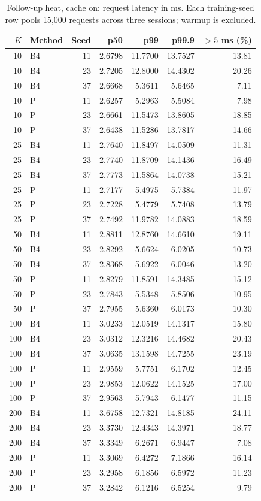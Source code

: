 \begin{table}[ht]
\centering\small
\caption{Follow-up heat, cache on: request latency in ms. Each training-seed row pools 15,000 requests across three sessions; warmup is excluded.}\label{tab:e2_seed_heat_on}
\begin{tabular}{@{}rlrrrrr@{}}\toprule
$K$ & Method & Seed & p50 & p99 & p99.9 & $>5$ ms (\%)\\\midrule
10 & B4 & 11 & 2.6798 & 11.7700 & 13.7527 & 13.81\\
10 & B4 & 23 & 2.7205 & 12.8000 & 14.4302 & 20.26\\
10 & B4 & 37 & 2.6668 & 5.3611 & 5.6465 & 7.11\\
10 & P & 11 & 2.6257 & 5.2963 & 5.5084 & 7.98\\
10 & P & 23 & 2.6661 & 11.5473 & 13.8605 & 18.85\\
10 & P & 37 & 2.6438 & 11.5286 & 13.7817 & 14.66\\
25 & B4 & 11 & 2.7640 & 11.8497 & 14.0509 & 11.31\\
25 & B4 & 23 & 2.7740 & 11.8709 & 14.1436 & 16.49\\
25 & B4 & 37 & 2.7773 & 11.5864 & 14.0738 & 15.21\\
25 & P & 11 & 2.7177 & 5.4975 & 5.7384 & 11.97\\
25 & P & 23 & 2.7228 & 5.4779 & 5.7408 & 13.79\\
25 & P & 37 & 2.7492 & 11.9782 & 14.0883 & 18.59\\
50 & B4 & 11 & 2.8811 & 12.8760 & 14.6610 & 19.11\\
50 & B4 & 23 & 2.8292 & 5.6624 & 6.0205 & 10.73\\
50 & B4 & 37 & 2.8368 & 5.6922 & 6.0046 & 13.20\\
50 & P & 11 & 2.8279 & 11.8591 & 14.3485 & 15.12\\
50 & P & 23 & 2.7843 & 5.5348 & 5.8506 & 10.95\\
50 & P & 37 & 2.7955 & 5.6360 & 6.0173 & 10.30\\
100 & B4 & 11 & 3.0233 & 12.0519 & 14.1317 & 15.80\\
100 & B4 & 23 & 3.0312 & 12.3216 & 14.4682 & 20.43\\
100 & B4 & 37 & 3.0635 & 13.1598 & 14.7255 & 23.19\\
100 & P & 11 & 2.9559 & 5.7751 & 6.1702 & 12.45\\
100 & P & 23 & 2.9853 & 12.0622 & 14.1525 & 17.00\\
100 & P & 37 & 2.9563 & 5.7943 & 6.1477 & 11.15\\
200 & B4 & 11 & 3.6758 & 12.7321 & 14.8185 & 24.11\\
200 & B4 & 23 & 3.3730 & 12.4343 & 14.3971 & 18.77\\
200 & B4 & 37 & 3.3349 & 6.2671 & 6.9447 & 7.08\\
200 & P & 11 & 3.3069 & 6.4272 & 7.1866 & 16.14\\
200 & P & 23 & 3.2958 & 6.1856 & 6.5972 & 11.23\\
200 & P & 37 & 3.2842 & 6.1216 & 6.5254 & 9.79\\
\bottomrule\end{tabular}
\end{table}
